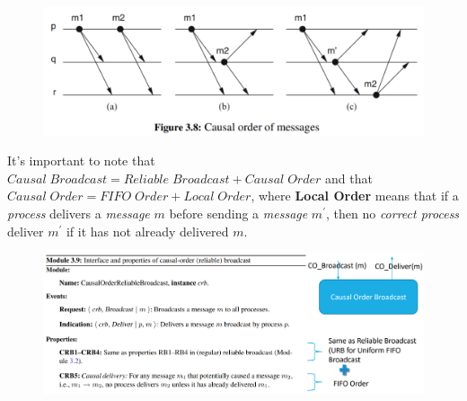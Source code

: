 \documentclass{article}
\begin{document}
\begin{figure}[H]
  \centering
  \includegraphics[scale=0.9]{cattura50.png}
\end{figure}
\hfill \break
It's important to note that $Causal\; Broadcast = Reliable\; Broadcast + Causal\; Order$ and that $Causal\; Order = FIFO\; Order + Local\; Order$, where \textbf{Local Order} means that if a \emph{process} delivers a \emph{message} $m$ before sending a \emph{message} $m^{'}$, then no \emph{correct process} deliver $m^{'}$ if it has not already delivered $m$. 
\begin{figure}[H]
  \centering
  \includegraphics[scale=0.6,left]{cattura51.png}
\end{figure}
\end{document}
